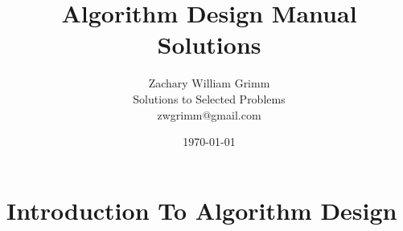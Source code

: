 \documentclass[10pt,letterpaper]{article}
\title{Algorithm Design Manual Solutions}
\author{Zachary William Grimm\\
  \small{Solutions to Selected Problems}\\
  \small{zwgrimm@gmail.com}
}
\date{\today{}}
\begin{document}
\maketitle

\tableofcontents{}

\newpage{}


\section{Introduction To Algorithm Design}

% 
% 









% 
\end{document}
